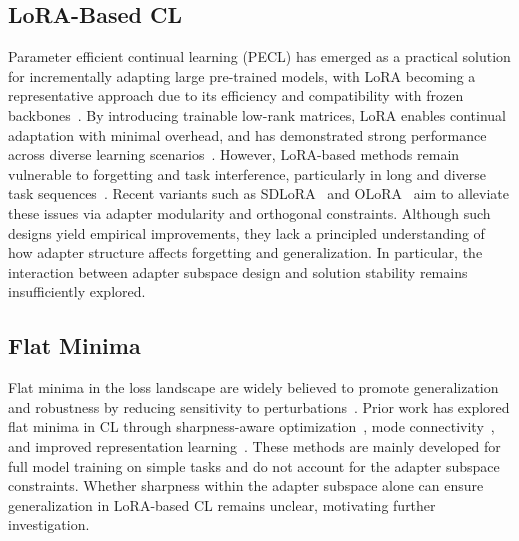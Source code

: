 \documentclass[letterpaper]{article} %
\begin{document}
\subsection{LoRA-Based CL}
Parameter efficient continual learning (PECL) has emerged as a practical solution for incrementally adapting large pre-trained models, with LoRA becoming a representative approach due to its efficiency and compatibility with frozen backbones~\cite{pmlr-v97-houlsby19a,Wang_2022_CVPR,dingParameterefficientFinetuningLargescale2023,xu2023parameterefficientfinetuningmethodspretrained,Yang_Muhtar_Shen_Zhan_Liu_Wang_Sun_Deng_Sun_Zhang_Chen_Tong_2025}. By introducing trainable low-rank matrices, LoRA enables continual adaptation with minimal overhead, and has demonstrated strong performance across diverse learning scenarios~\cite{hu2022lora}.
However, LoRA-based methods remain vulnerable to forgetting and task interference, particularly in long and diverse task sequences~\cite{Gao_2023_ICCV,10.1145/3730436.3730456,yang2024parametercollisionhinderingcontinual}. Recent variants such as SDLoRA~\cite{wu2025sdlorascalabledecoupledlowrank} and OLoRA~\cite{NEURIPS2020_70d85f35,wang2023orthogonal} aim to alleviate these issues via adapter modularity and orthogonal constraints. 
Although such designs yield empirical improvements, they lack a principled understanding of how adapter structure affects forgetting and generalization. In particular, the interaction between adapter subspace design and solution stability remains insufficiently explored.


\subsection{Flat Minima}


Flat minima in the loss landscape are widely believed to promote generalization and robustness by reducing sensitivity to perturbations~\cite{FlatMinima1997,wu2017understandinggeneralizationdeeplearning,chaudhariEntropySGDBiasingGradient2019,NEURIPS2020_518a38cc,bahri2022sharpnessawareminimizationimproveslanguage,NEURIPS2020_518a38cc,NEURIPS2021_995f5e03,JMLRAnEmpiricalInvestigatio,yangRevisitingFlatnessAwareOptimization2025}. 
Prior work has explored flat minima in CL through sharpness-aware optimization~\cite{pmlr-v151-bisla22a,foretSharpnessAwareMinimizationEfficiently2021,zhangGradientNormAware2023}, mode connectivity~\cite{izmailov2019averagingweightsleadswider,mirzadeh2020linearmodeconnectivitymultitask}, and improved representation learning~\cite{hu2022doesselfsupervisedpretrainingperform,ramasesh2022effect}.
These methods are mainly developed for full model training on simple tasks and do not account for the adapter subspace constraints\cite{yangRevisitingFlatnessAwareOptimization2025}. Whether sharpness within the adapter subspace alone can ensure generalization in LoRA-based CL remains unclear, motivating further investigation.
\end{document}
